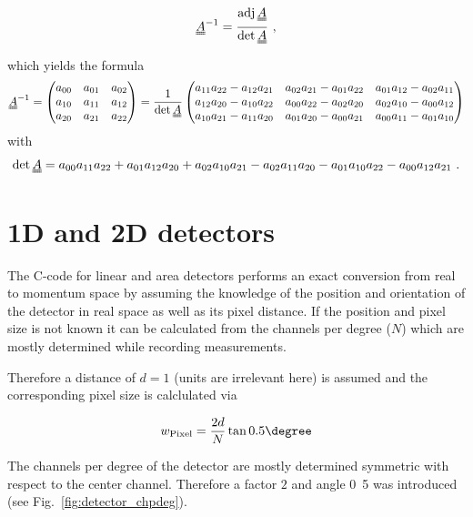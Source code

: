 \begin{align}
 \mat A^{-1} = \frac{\operatorname{adj} \mat A} {\operatorname{det} \mat A} \text{ ,}
\end{align}
which yields the formula
\begin{align}
 \mat A^{-1} = \begin{pmatrix} a_{00} & a_{01} & a_{02} \\
                               a_{10} & a_{11} & a_{12} \\
                               a_{20} & a_{21} & a_{22} \end{pmatrix}
= \frac{1}{\operatorname{det}\mat A}
\begin{pmatrix}
a_{11} a_{22} - a_{12} a_{21} & a_{02} a_{21} - a_{01} a_{22} & a_{01} a_{12} - a_{02} a_{11} \\
a_{12} a_{20} - a_{10} a_{22} & a_{00} a_{22} - a_{02} a_{20} & a_{02} a_{10} - a_{00} a_{12} \\
a_{10} a_{21} - a_{11} a_{20} & a_{01} a_{20} - a_{00} a_{21} & a_{00} a_{11} - a_{01} a_{10}
\end{pmatrix}
\end{align}
with
\begin{align}
 \operatorname{det} \mat A = a_{00}a_{11}a_{22} + a_{01}a_{12}a_{20} + a_{02}a_{10}a_{21} - a_{02}a_{11}a_{20} - a_{01}a_{10}a_{22} - a_{00}a_{12}a_{21} \text{ .}
\end{align}

\section{1D and 2D detectors}

The C-code for linear and area detectors performs an exact conversion from real to momentum space by assuming the knowledge of the position and orientation of the detector in real space as well as its pixel distance. If the position and pixel size is not known it can be calculated from the channels per degree ($N$) which are mostly determined while recording measurements.

Therefore a distance of $d=1$ (units are irrelevant here) is assumed and the corresponding pixel size is calclulated via

\begin{align}
 w_\text{Pixel} = \frac{2d}{N} \tan\unit{0.5}{\degree}
\end{align}

The channels per degree of the detector are mostly determined symmetric with respect to the center channel. Therefore a factor $2$ and angle \unit{0.5}{\degree} was introduced (see Fig.~\ref{fig:detector_chpdeg}).

